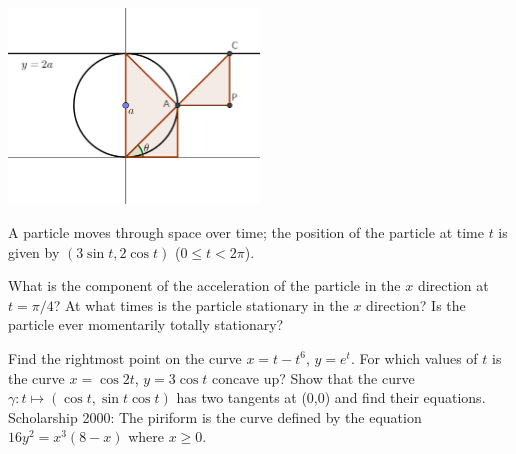 \begin{questions}
\begin{center}
              \includegraphics[width=0.5\textwidth]{agnesi-geom}
            \end{center}
  \question A particle moves through space over time; the position of the particle at time $ t $ is
            given by $ (3\sin t, 2\cos t) $ ($ 0 \leq t < 2\pi $).
            \begin{parts}
              \parA What is the component of the acceleration of the particle in the $ x $ direction at $ t = \pi/4 $?
              \parA At what times is the particle stationary in the $ x $ direction?
              \parM Is the particle ever momentarily totally stationary?
            \end{parts}
  \questioE Find the rightmost point on the curve $ x = t - t^6 $, $ y = e^t $.
  \questioE For which values of $ t $ is the curve $ x = \cos 2t $, $ y = 3\cos t $ concave up?
  \questioS Show that the curve $ \gamma : t \mapsto (\cos t, \sin t \cos t) $ has two tangents at (0,0)
            and find their equations.
  \questioS Scholarship 2000: The piriform is the curve defined by the equation $ 16y^2 = x^3(8-x) $ where $ x \geq 0 $.
\end{questions}

